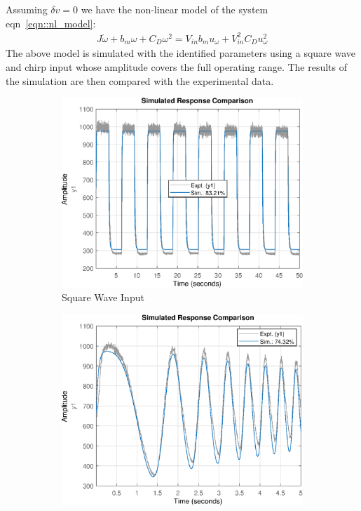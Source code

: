 Assuming $\delta v = 0$ we have the non-linear model of the system eqn~\ref{eqn::nl_model}:
\begin{align*}
    J \dot \omega + b_m \omega + C_D \omega^2 = V_{in} b_m u_\omega + V_{in}^2 C_D u_\omega^2
\end{align*}
The above model is simulated with the identified parameters using a square wave and chirp input whose amplitude covers the full operating range. The results of the simulation are then compared with the experimental data.
\begin{figure}[H]
    \begin{minipage}{0.49\textwidth}
        \begin{figure}[H]
            \includegraphics[width = \textwidth]{./figs/nl_valid/square_validation.eps}
            \caption*{Square Wave Input}
        \end{figure}
    \end{minipage}
    \begin{minipage}{0.49\textwidth}
        \begin{figure}[H]
            \includegraphics[width = \textwidth]{./figs/nl_valid/chirp_validation.eps}

\end{figure}
\end{minipage}
\end{figure}
